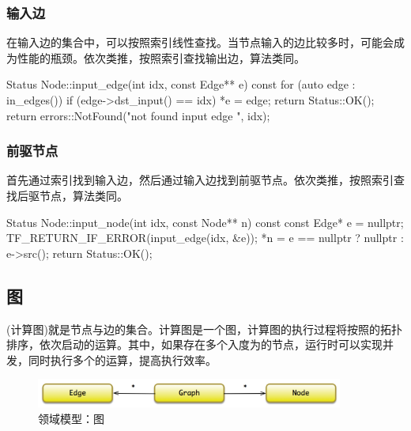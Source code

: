 \begin{content}
\subsubsection{输入边}

在输入边的集合中，可以按照索引线性查找。当节点输入的边比较多时，可能会成为性能的瓶颈。依次类推，按照索引查找输出边，算法类同。

\begin{leftbar}
\begin{c++}
Status Node::input_edge(int idx, const Edge** e) const {
  for (auto edge : in_edges()) {
    if (edge->dst_input() == idx) {
      *e = edge;
      return Status::OK();
    }
  }
  return errors::NotFound("not found input edge ", idx);
}
\end{c++}
\end{leftbar}

\subsubsection{前驱节点}

首先通过索引找到输入边，然后通过输入边找到前驱节点。依次类推，按照索引查找后驱节点，算法类同。

\begin{leftbar}
\begin{c++}
Status Node::input_node(int idx, const Node** n) const {
  const Edge* e = nullptr;
  TF_RETURN_IF_ERROR(input_edge(idx, &e));
  *n = e == nullptr ? nullptr : e->src();
  return Status::OK();
}
\end{c++}
\end{leftbar}

\subsection{图}

(计算图)就是节点与边的集合。计算图是一个图，计算图的执行过程将按照的拓扑排序，依次启动的运算。其中，如果存在多个入度为的节点，运行时可以实现并发，同时执行多个的运算，提高执行效率。

\begin{figure}[H]
\centering
\includegraphics[width=0.9\textwidth]{figures/cc-graph-model.png}
\caption{领域模型：图}
 \label{fig:cc-graph-model}
\end{figure}


\end{content}
